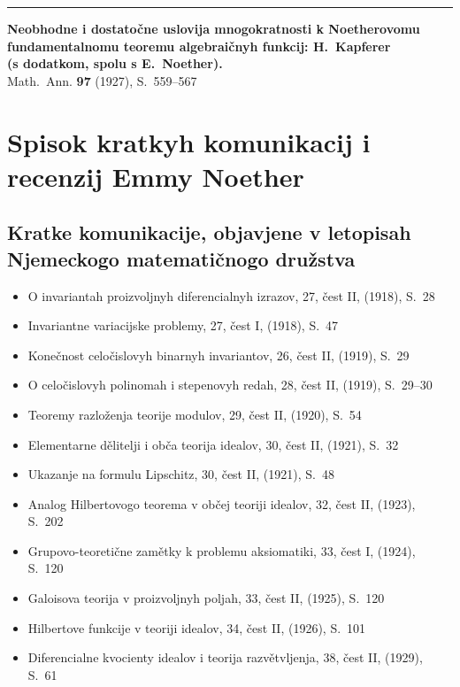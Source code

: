 \documentclass[11pt]{article}
\newcommand{\foreign}[1]{#1}
\begin{document}
\vspace{1em}
\noindent\rule{\textwidth}{0.4pt}
\vspace{0.5em}

\noindent\textbf{Neobhodne i dostatočne uslovija mnogokratnosti k Noetherovomu}\\
\textbf{fundamentalnomu teoremu algebraičnyh funkcij: H.\ Kapferer}\\
\textbf{(s dodatkom, spolu s E.\ Noether).}\\
\foreign{Math.\ Ann.} \textbf{97} (1927), S.~559--567

\newpage
\section*{Spisok kratkyh komunikacij i recenzij Emmy Noether}

\subsection*{Kratke komunikacije, objavjene v letopisah Njemeckogo matematičnogo družstva}

\begin{itemize}[leftmargin=1.5em,itemsep=0.2em]
\item O invariantah proizvoljnyh diferencialnyh izrazov, 27, čest II, (1918), S.~28
\item Invariantne variacijske problemy, 27, čest I, (1918), S.~47
\item Konečnost celočislovyh binarnyh invariantov, 26, čest II, (1919), S.~29
\item O celočislovyh polinomah i stepenovyh redah, 28, čest II, (1919), S.~29--30
\item Teoremy razloženja teorije modulov, 29, čest II, (1920), S.~54
\item Elementarne dělitelji i obča teorija idealov, 30, čest II, (1921), S.~32
\item Ukazanje na formulu Lipschitz, 30, čest II, (1921), S.~48
\item Analog Hilbertovogo teorema v občej teoriji idealov, 32, čest II, (1923), S.~202
\item Grupovo-teoretične zamětky k problemu aksiomatiki, 33, čest I, (1924), S.~120
\item Galoisova teorija v proizvoljnyh poljah, 33, čest II, (1925), S.~120
\item Hilbertove funkcije v teoriji idealov, 34, čest II, (1926), S.~101
\item Diferencialne kvocienty idealov i teorija razvětvljenja, 38, čest II, (1929), S.~61
\end{itemize}
\end{document}
